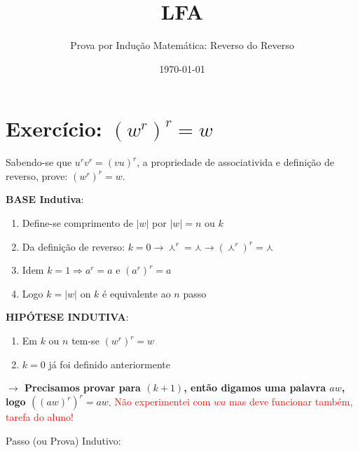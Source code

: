 \documentclass[a4paper,12pt]{article}
\title{LFA}
\author{Prova por Indução Matemática: Reverso do Reverso}
\date{\today}
\begin{document}
\maketitle


\section{Exercício: $(w^r)^r=w$}

 Sabendo-se que $u^rv^r=(vu)^r$, a propriedade de associativida e definição de reverso, prove: $(w^r)^r=w$.
	
	\vspace{1cm}	
	\textbf{BASE Indutiva}:

\begin{enumerate}
		
	\item Define-se comprimento de $|w|$ por $|w| = n $ ou $k$
	
		\item Da definição de reverso: $k=0 \rightarrow \curlywedge^r = \curlywedge \rightarrow (\curlywedge^r)^r =\curlywedge $
		
	\item Idem $k=1 \Rightarrow a^r = a$ e $(a^r)^r = a$
	\item Logo $k=|w|$ on $k$ é equivalente ao $n$ passo 
			
	\end{enumerate}
	
	\vspace{1cm}
	\textbf{HIPÓTESE INDUTIVA}:
	
	\begin{enumerate}
		\item Em $k$ ou  $n$ tem-se $(w^r)^r=w $
		\item $k=0$  já foi definido anteriormente 
	
	\end{enumerate}

	\vspace{1cm}	
	\textbf{$\rightarrow$ Precisamos provar para $(k+1)$, então digamos uma palavra $aw$, logo $((aw)^r)^r = aw $}. \textcolor{red}{Não experimentei com $wa$ mas deve funcionar também, tarefa do aluno!}  

	
	\vspace{1cm}	
	Passo (ou Prova)  Indutivo:
\end{document}
